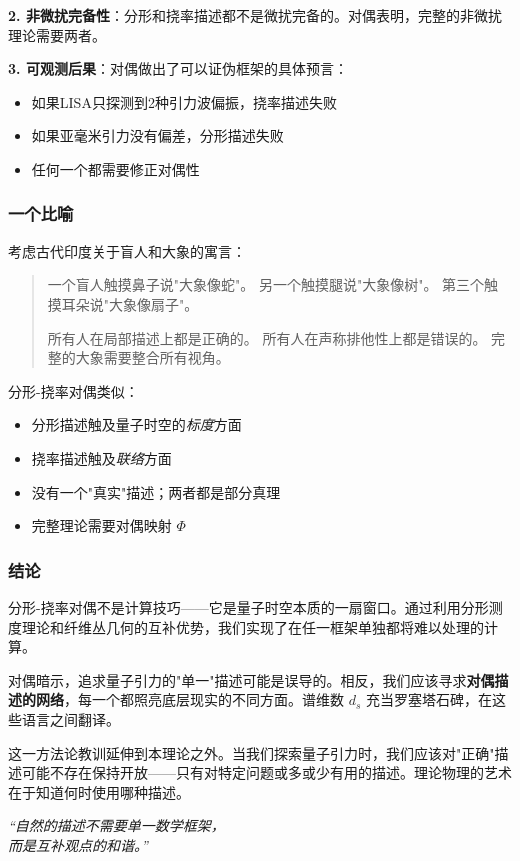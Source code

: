 \textbf{2. 非微扰完备性}：分形和挠率描述都不是微扰完备的。对偶表明，完整的非微扰理论需要两者。

\textbf{3. 可观测后果}：对偶做出了可以证伪框架的具体预言：
\begin{itemize}
    \item 如果LISA只探测到2种引力波偏振，挠率描述失败
    \item 如果亚毫米引力没有偏差，分形描述失败
    \item 任何一个都需要修正对偶性
\end{itemize}

\subsubsection{一个比喻}

考虑古代印度关于盲人和大象的寓言：

\begin{quote}
一个盲人触摸鼻子说"大象像蛇"。
另一个触摸腿说"大象像树"。
第三个触摸耳朵说"大象像扇子"。

所有人在局部描述上都是正确的。
所有人在声称排他性上都是错误的。
完整的大象需要整合所有视角。
\end{quote}

分形-挠率对偶类似：
\begin{itemize}
    \item 分形描述触及量子时空的\textit{标度}方面
    \item 挠率描述触及\textit{联络}方面
    \item 没有一个"真实"描述；两者都是部分真理
    \item 完整理论需要对偶映射 $\Phi$
\end{itemize}

\subsubsection{结论}

分形-挠率对偶不是计算技巧——它是量子时空本质的一扇窗口。通过利用分形测度理论和纤维丛几何的互补优势，我们实现了在任一框架单独都将难以处理的计算。

对偶暗示，追求量子引力的"单一"描述可能是误导的。相反，我们应该寻求\textbf{对偶描述的网络}，每一个都照亮底层现实的不同方面。谱维数 $d_s$ 充当罗塞塔石碑，在这些语言之间翻译。

这一方法论教训延伸到本理论之外。当我们探索量子引力时，我们应该对"正确"描述可能不存在保持开放——只有对特定问题或多或少有用的描述。理论物理的艺术在于知道何时使用哪种描述。

\begin{flushright}
\textit{``自然的描述不需要单一数学框架，\\而是互补观点的和谐。''}
\end{flushright}
